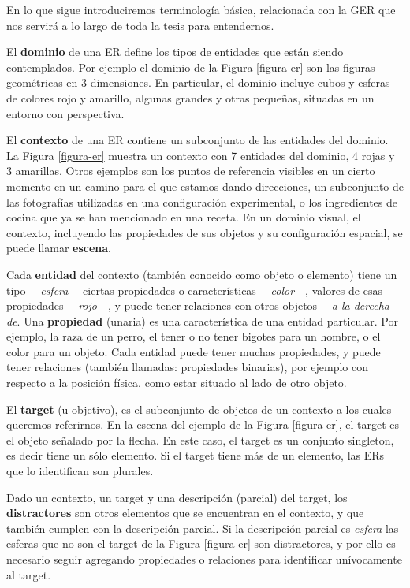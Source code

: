 En lo que sigue introduciremos terminolog\'ia b\'asica, relacionada con la GER que nos servir\'a a lo largo de toda la tesis para entendernos.

El {\bf dominio} de una ER define los tipos de entidades que est\'an siendo contemplados. Por ejemplo el dominio de la Figura \ref{figura-er} son las figuras geom\'etricas en 3 dimensiones. En particular, el dominio incluye cubos y esferas de colores rojo y amarillo, algunas grandes y otras peque\~nas, situadas en un entorno con perspectiva.

El {\bf contexto} de una ER contiene un subconjunto de las entidades del dominio. La Figura \ref{figura-er} muestra un contexto con 7 entidades del dominio, 4 rojas y 3 amarillas. Otros ejemplos son los puntos de referencia visibles en un cierto momento en un camino para el que estamos dando direcciones, un subconjunto de las fotograf\'ias utilizadas en una configuraci\'on experimental, o los ingredientes de cocina que ya se han mencionado en una receta. En un dominio visual, el contexto, incluyendo las propiedades de sus objetos y su configuraci\'on espacial, se puede llamar \textbf{escena}. %

Cada {\bf entidad} del contexto (tambi\'en conocido como objeto o elemento) tiene un tipo ---\emph{esfera}--- ciertas propiedades o caracter\'isticas ---\emph{color}---, valores de esas propiedades ---\emph{rojo}---, y puede tener relaciones con otros objetos ---\emph{a la derecha de}. Una {\bf propiedad} (unaria) es una caracter\'istica de una entidad particular. Por ejemplo, la raza de un perro, el tener o no tener bigotes para un hombre, o el color para un objeto. Cada entidad puede tener muchas propiedades, y puede tener relaciones (tambi\'en llamadas: propiedades binarias), por ejemplo con respecto a la posici\'on f\'isica, como estar situado al lado de otro objeto. 

El {\bf target} (u objetivo), es el subconjunto de objetos de un contexto a los cuales queremos referirnos. En la escena del ejemplo de la Figura \ref{figura-er}, el target es el objeto se\~nalado por la flecha. En este caso, el target es un conjunto singleton, es decir tiene un s\'olo elemento. Si el target tiene m\'as de un elemento, las ERs que lo identifican son plurales.

Dado un contexto, un target y una descripci\'on (parcial) del target, los {\bf distractores} son otros elementos que se encuentran en el contexto, y que tambi\'en cumplen con la descripci\'on parcial. Si la descripci\'on parcial es {\it esfera} las esferas que no son el target de la Figura \ref{figura-er} son  distractores, y por ello es necesario seguir agregando propiedades o relaciones para identificar un\'ivocamente al target.


